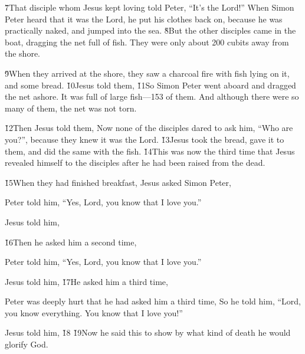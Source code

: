 \v{7}That disciple whom Jesus kept loving told Peter, ``It's the Lord!'' When Simon Peter heard that it was the Lord, he put his clothes back on, because he was practically naked, and jumped into the sea. \v{8}But the other disciples came in the boat, dragging the net full of fish. They were only about 200 cubits away from the shore.

\v{9}When they arrived at the shore, they saw a charcoal fire with fish lying on it, and some bread. \v{10}Jesus told them,  \v{11}So Simon Peter went aboard and dragged the net ashore. It was full of large fish---153 of them. And although there were so many of them, the net was not torn.

\v{12}Then Jesus told them,  Now none of the disciples dared to ask him, ``Who are you?'', because they knew it was the Lord. \v{13}Jesus took the bread, gave it to them, and did the same with the fish. \v{14}This was now the third time that Jesus revealed himself to the disciples after he had been raised from the dead.

\v{15}When they had finished breakfast, Jesus asked Simon Peter, 

Peter told him, ``Yes, Lord, you know that I love you.''

Jesus told him, 

\v{16}Then he asked him a second time, 

Peter told him, ``Yes, Lord, you know that I love you.''

Jesus told him,  \v{17}He asked him a third time, 

Peter was deeply hurt that he had asked him a third time, So he told him, ``Lord, you know everything. You know that I love you!''

Jesus told him,  \v{18}  \v{19}Now he said this to show by what kind of death he would glorify God.

